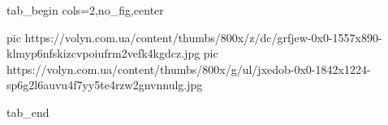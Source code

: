 
 
 
 
 

\ifcmt
  tab_begin cols=2,no_fig,center

     pic https://volyn.com.ua/content/thumbs/800x/z/dc/grfjew-0x0-1557x890-klmyp6nfskizcvpoiufrm2vefk4kgdcz.jpg
		 pic https://volyn.com.ua/content/thumbs/800x/g/ul/jxedob-0x0-1842x1224-sp6g2l6auvu4f7yy5te4rzw2gnvnnulg.jpg

  tab_end
\fi
